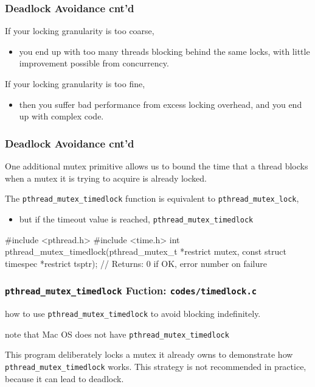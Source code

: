 \documentclass[newPxFont,sthlmFooter,nooffset]{beamer}
\begin{document}
\begin{frame}[t]
  \frametitle{Deadlock Avoidance cnt'd}
If your locking granularity is too coarse,
\begin{itemize}
\item you end up with too many threads blocking behind the same locks,
  with little improvement possible from concurrency.
\end{itemize}
If your locking granularity is too fine,
\begin{itemize}
\item then you suffer bad performance from excess locking overhead,
  and you end up with complex code.
\end{itemize}

\end{frame}

\begin{frame}[fragile, t]
  \frametitle{Deadlock Avoidance cnt'd}
One additional mutex primitive allows us to bound the time that a thread blocks when a mutex it is trying to acquire is already locked.

The \texttt{pthread\_mutex\_timedlock} function is equivalent to \texttt{pthread\_mutex\_lock},
\begin{itemize}
\item but if the timeout value is reached, \texttt{pthread\_mutex\_timedlock}
\end{itemize}

\begin{codedef}
#include <pthread.h>
#include <time.h>
int pthread_mutex_timedlock(pthread_mutex_t *restrict mutex,
                           const struct timespec *restrict tsptr);
// Returns: 0 if OK, error number on failure
\end{codedef}
\end{frame}

\begin{frame}
  \frametitle{\texttt{pthread\_mutex\_timedlock} Fuction: \texttt{codes/timedlock.c}}
how to use \texttt{pthread\_mutex\_timedlock} to avoid blocking indefinitely.

note that Mac OS does not have \texttt{pthread\_mutex\_timedlock}


This program deliberately locks a mutex it already owns to demonstrate how \texttt{pthread\_mutex\_timedlock} works. This strategy is not recommended in practice, because it can lead to deadlock.
\end{frame}
\end{document}
